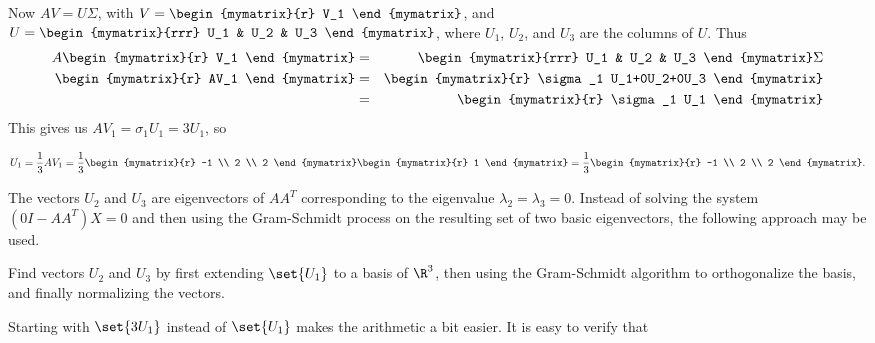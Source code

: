 \begin{solution}
Now $AV=U\Sigma$, with
$V=\begin{mymatrix}{r} V_1 \end{mymatrix}$,
and $U=\begin{mymatrix}{rrr} U_1 & U_2 & U_3 \end{mymatrix}$,
where $U_1$, $U_2$, and $U_3$ are the columns of $U$.
Thus
\begin{eqnarray*}
A\begin{mymatrix}{r} V_1 \end{mymatrix}
&=& \begin{mymatrix}{rrr} U_1 & U_2 & U_3 \end{mymatrix}\Sigma\\
\begin{mymatrix}{r} AV_1 \end{mymatrix}
&=& \begin{mymatrix}{r} \sigma_1 U_1+0U_2+0U_3 \end{mymatrix}\\
&=& \begin{mymatrix}{r} \sigma_1 U_1 \end{mymatrix}
\end{eqnarray*}
This gives us $AV_1=\sigma_1 U_1= 3U_1$, so

\[ U_1 = \frac{1}{3}AV_1 
= \frac{1}{3}
\begin{mymatrix}{r} -1 \\ 2 \\ 2 \end{mymatrix}
\begin{mymatrix}{r} 1 \end{mymatrix}
= \frac{1}{3}
\begin{mymatrix}{r} -1 \\ 2 \\ 2 \end{mymatrix}.\]

The vectors $U_2$ and $U_3$ are eigenvectors of $AA^T$ corresponding
to the eigenvalue $\lambda_2=\lambda_3=0$.
Instead of solving the system $(0I-AA^T)X= 0$ and then using the
Gram-Schmidt process on the resulting set of
two basic eigenvectors, the following approach may be used.


Find vectors $U_2$ and $U_3$ by first extending $\set{U_1}$ to a basis of
$\R^3$, then using the Gram-Schmidt algorithm to orthogonalize the basis,
and finally normalizing the vectors.

Starting with $\set{3U_1}$ instead of $\set{U_1}$ makes the
arithmetic a bit easier.
It is easy to verify that


\end{solution}
